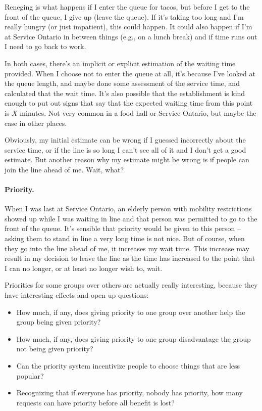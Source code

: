 Reneging is what happens if I enter the queue for tacos, but before I get to the front of the queue, I give up (leave the queue). If it's taking too long and I'm really hungry (or just impatient), this could happen. It could also happen if I'm at Service Ontario in between things (e.g., on a lunch break) and if time runs out I need to go back to work.

In both cases, there's an implicit or explicit estimation of the waiting time provided. When I choose not to enter the queue at all, it's because I've looked at the queue length, and maybe done some assessment of the service time, and calculated that the wait time. It's also possible that the establishment is kind enough to put out signs that say that the expected waiting time from this point is $X$ minutes. Not very common in a food hall or Service Ontario, but maybe the case in other places.

Obviously, my initial estimate can be wrong if I guessed incorrectly about the service time, or if the line is so long I can't see all of it and I don't get a good estimate. But another reason why my estimate might be wrong is if people can join the line ahead of me. Wait, what?

\paragraph{Priority.}
When I was last at Service Ontario, an elderly person with mobility restrictions showed up while I was waiting in line and that person was permitted to go to the front of the queue. It's sensible that priority would be given to this person -- asking them to stand in line a very long time is not nice. But of course, when they go into the line ahead of me, it increases my wait time. This increase may result in my decision to leave the line as the time has increased to the point that I can no longer, or at least no longer wish to, wait. 

Priorities for some groups over others are actually really interesting, because they have interesting effects and open up questions:

\begin{itemize}
	\item How much, if any, does giving priority to one group over another help the group being given priority?
	\item How much, if any, does giving priority to one group disadvantage the group not being given priority?
	\item Can the priority system incentivize people to choose things that are less popular?
	\item Recognizing that if everyone has priority, nobody has priority, how many requests can have priority before all benefit is lost?
\end{itemize}



